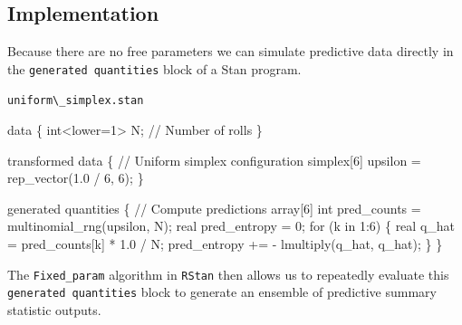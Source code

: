 \documentclass[
  letterpaper,
  DIV=11,
  numbers=noendperiod]{scrartcl}
\newenvironment{Shaded}{\begin{snugshade}}{\end{snugshade}}
\newcommand{\CommentTok}[1]{\textcolor[rgb]{0.37,0.37,0.37}{#1}}
\newcommand{\ControlFlowTok}[1]{\textcolor[rgb]{0.00,0.23,0.31}{#1}}
\newcommand{\DataTypeTok}[1]{\textcolor[rgb]{0.68,0.00,0.00}{#1}}
\newcommand{\DecValTok}[1]{\textcolor[rgb]{0.68,0.00,0.00}{#1}}
\newcommand{\FloatTok}[1]{\textcolor[rgb]{0.68,0.00,0.00}{#1}}
\newcommand{\KeywordTok}[1]{\textcolor[rgb]{0.00,0.23,0.31}{#1}}
\newcommand{\NormalTok}[1]{\textcolor[rgb]{0.00,0.23,0.31}{#1}}
\begin{document}
\subsection{Implementation}\label{implementation}

Because there are no free parameters we can simulate predictive data
directly in the \texttt{generated\ quantities} block of a Stan program.

\begin{codelisting}

\caption{\texttt{uniform\textbackslash\_simplex.stan}}

\begin{Shaded}
\begin{Highlighting}[]
\KeywordTok{data}\NormalTok{ \{}
  \DataTypeTok{int}\NormalTok{\textless{}}\KeywordTok{lower}\NormalTok{=}\DecValTok{1}\NormalTok{\textgreater{} N; }\CommentTok{// Number of rolls}
\NormalTok{\}}

\KeywordTok{transformed data}\NormalTok{ \{}
  \CommentTok{// Uniform simplex configuration}
  \DataTypeTok{simplex}\NormalTok{[}\DecValTok{6}\NormalTok{] upsilon = rep\_vector(}\FloatTok{1.0}\NormalTok{ / }\DecValTok{6}\NormalTok{, }\DecValTok{6}\NormalTok{);}
\NormalTok{\}}

\KeywordTok{generated quantities}\NormalTok{ \{}
  \CommentTok{// Compute predictions}
  \DataTypeTok{array}\NormalTok{[}\DecValTok{6}\NormalTok{] }\DataTypeTok{int}\NormalTok{ pred\_counts = multinomial\_rng(upsilon, N);}
  \DataTypeTok{real}\NormalTok{ pred\_entropy = }\DecValTok{0}\NormalTok{;}
  \ControlFlowTok{for}\NormalTok{ (k }\ControlFlowTok{in} \DecValTok{1}\NormalTok{:}\DecValTok{6}\NormalTok{) \{}
    \DataTypeTok{real}\NormalTok{ q\_hat = pred\_counts[k] * }\FloatTok{1.0}\NormalTok{ / N;}
\NormalTok{    pred\_entropy += {-} lmultiply(q\_hat, q\_hat);}
\NormalTok{  \}}
\NormalTok{\}}
\end{Highlighting}
\end{Shaded}

\end{codelisting}

The \texttt{Fixed\_param} algorithm in \texttt{RStan} then allows us to
repeatedly evaluate this \texttt{generated\ quantities} block to
generate an ensemble of predictive summary statistic outputs.
\end{document}
